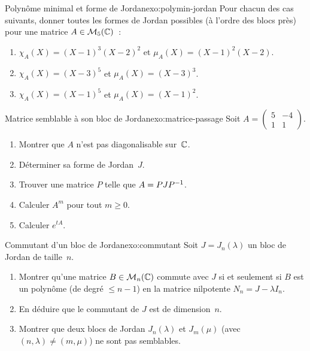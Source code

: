 \begin{exercise}{Polynôme minimal et forme de Jordan}{exo:polymin-jordan}
  \intermediate
  Pour chacun des cas suivants, donner toutes les formes de Jordan
  possibles (à l'ordre des blocs près) pour une matrice $A\in\mathcal{M}_5({\mathbb{C}})$~:
  \begin{enumerate}[label=(\alph*)]
    \item $\chi_A(X)=(X-1)^3(X-2)^2$ et $\mu_A(X)=(X-1)^2(X-2)$.
    \item $\chi_A(X)=(X-3)^5$ et $\mu_A(X)=(X-3)^3$.
    \item $\chi_A(X)=(X-1)^5$ et $\mu_A(X)=(X-1)^2$.
  \end{enumerate}
\end{exercise}

\begin{exercise}{Matrice semblable à son bloc de Jordan}{exo:matrice-passage}
  \challenging
  Soit $A=\begin{pmatrix}5&-4\\1&1\end{pmatrix}$.
  \begin{enumerate}[label=(\alph*)]
    \item Montrer que $A$ n'est pas diagonalisable sur~${\mathbb{C}}$.
    \item Déterminer sa forme de Jordan~$J$.
    \item Trouver une matrice $P$ telle que $A=PJ{P}^{-1}$.
    \item Calculer $A^m$ pour tout $m\geq 0$.
    \item Calculer $e^{tA}$.
  \end{enumerate}
\end{exercise}

\begin{exercise}{Commutant d'un bloc de Jordan}{exo:commutant}
  \challenging
  Soit $J=J_n(\lambda)$ un bloc de Jordan de taille~$n$.
  \begin{enumerate}[label=(\alph*)]
    \item Montrer qu'une matrice $B\in\mathcal{M}_n({\mathbb{C}})$ commute avec $J$ si
      et seulement si $B$ est un polynôme (de degré $\leq n-1$) en la
      matrice nilpotente $N_n=J-\lambda I_n$.
    \item En déduire que le commutant de $J$ est de dimension~$n$.
    \item Montrer que deux blocs de Jordan $J_n(\lambda)$ et $J_m(\mu)$
      (avec $(n,\lambda)\neq(m,\mu)$) ne sont pas semblables.
  \end{enumerate}
\end{exercise}

